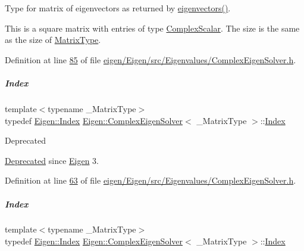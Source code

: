 Type for matrix of eigenvectors as returned by \hyperlink{group___eigenvalues___module_a3aa5e27800349990778da8fa532c1270}{eigenvectors()}. 

This is a square matrix with entries of type \hyperlink{group___eigenvalues___module_a3604c99a69fac3bee42c88cb2b589143}{Complex\+Scalar}. The size is the same as the size of \hyperlink{group___eigenvalues___module_ad61f6278843a601096276c9a72c0252f}{Matrix\+Type}. 

Definition at line \hyperlink{eigen_2_eigen_2src_2_eigenvalues_2_complex_eigen_solver_8h_source_l00085}{85} of file \hyperlink{eigen_2_eigen_2src_2_eigenvalues_2_complex_eigen_solver_8h_source}{eigen/\+Eigen/src/\+Eigenvalues/\+Complex\+Eigen\+Solver.\+h}.

\mbox{\label{group___eigenvalues___module_abc0218d8b902af0d6c759bfc0a8a8d74}} 
\subparagraph{\texorpdfstring{Index}{Index}\hspace{0.1cm}{\footnotesize\ttfamily [1/2]}}
{\footnotesize\ttfamily template$<$typename \+\_\+\+Matrix\+Type$>$ \\
typedef \hyperlink{namespace_eigen_a62e77e0933482dafde8fe197d9a2cfde}{Eigen\+::\+Index} \hyperlink{group___eigenvalues___module_class_eigen_1_1_complex_eigen_solver}{Eigen\+::\+Complex\+Eigen\+Solver}$<$ \+\_\+\+Matrix\+Type $>$\+::\hyperlink{group___eigenvalues___module_abc0218d8b902af0d6c759bfc0a8a8d74}{Index}}

\begin{DoxyRefDesc}{Deprecated}
\item[\hyperlink{deprecated__deprecated000016}{Deprecated}]since \hyperlink{namespace_eigen}{Eigen} 3. \end{DoxyRefDesc}


Definition at line \hyperlink{eigen_2_eigen_2src_2_eigenvalues_2_complex_eigen_solver_8h_source_l00063}{63} of file \hyperlink{eigen_2_eigen_2src_2_eigenvalues_2_complex_eigen_solver_8h_source}{eigen/\+Eigen/src/\+Eigenvalues/\+Complex\+Eigen\+Solver.\+h}.

\mbox{\label{group___eigenvalues___module_abc0218d8b902af0d6c759bfc0a8a8d74}} 
\subparagraph{\texorpdfstring{Index}{Index}\hspace{0.1cm}{\footnotesize\ttfamily [2/2]}}
{\footnotesize\ttfamily template$<$typename \+\_\+\+Matrix\+Type$>$ \\
typedef \hyperlink{namespace_eigen_a62e77e0933482dafde8fe197d9a2cfde}{Eigen\+::\+Index} \hyperlink{group___eigenvalues___module_class_eigen_1_1_complex_eigen_solver}{Eigen\+::\+Complex\+Eigen\+Solver}$<$ \+\_\+\+Matrix\+Type $>$\+::\hyperlink{group___eigenvalues___module_abc0218d8b902af0d6c759bfc0a8a8d74}{Index}}

